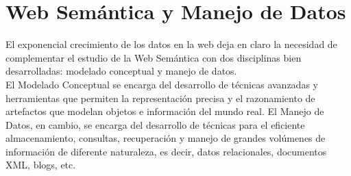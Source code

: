 \documentclass[10pt,a4paper]{article}
\begin{document}
\section{Web Semántica y Manejo de Datos}
El exponencial crecimiento de los datos en la web deja en claro la necesidad de complementar el estudio de la Web Semántica con dos disciplinas bien desarrolladas: modelado conceptual y manejo de datos. 
\\
El Modelado Conceptual se encarga del desarrollo de técnicas avanzadas y herramientas que permiten la representación precisa y el razonamiento de artefactos que modelan objetos e información del mundo real. El Manejo de Datos, en cambio, se encarga del desarrollo de técnicas para el eficiente almacenamiento, consultas, recuperación y manejo de grandes volúmenes de información de diferente naturaleza, es decir, datos relacionales, documentos XML, blogs, etc.
\end{document}
